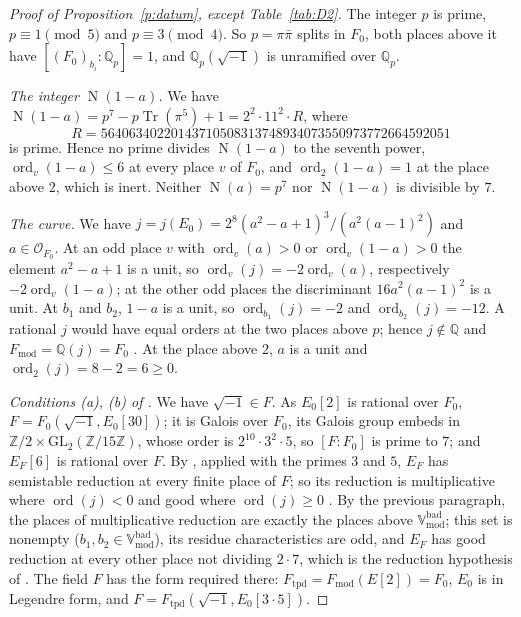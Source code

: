 \documentclass[11pt]{amsart}
\theoremstyle{remark}
\newcommand{\Q}{\mathbb Q}
\newcommand{\Z}{\mathbb Z}
\newcommand{\Qp}{\mathbb Q_p}
\newcommand{\cO}{\mathcal O}
\newcommand{\Fmod}{F_{\mathrm{mod}}}
\newcommand{\Vbadmod}{\mathbb V^{\mathrm{bad}}_{\mathrm{mod}}}
\newcommand{\Nm}{\operatorname{N}}
\newcommand{\Tr}{\operatorname{Tr}}
\begin{document}
\begin{proof}[Proof of Proposition~\ref{p:datum}, except Table~\ref{tab:D2}]
The integer $p$ is prime, $p\equiv1\pmod5$ and $p\equiv3\pmod4$. So $p=\pi\bar\pi$ splits in $F_0$, both places
above it have $[(F_0)_{b_i}:\Qp]=1$, and $\Qp(\sqrt{-1})$ is unramified over $\Qp$.

\emph{The integer $\Nm(1-a)$.} We have $\Nm(1-a)=p^7-p\Tr(\pi^5)+1=2^2\cdot11^2\cdot R$, where
\[
R=56406340220143710508313748934073550973772664592051
\]
is prime. Hence no prime divides $\Nm(1-a)$ to the seventh power, $\operatorname{ord}_v(1-a)\le6$ at every place $v$ of $F_0$,
and $\operatorname{ord}_2(1-a)=1$ at the place above $2$, which is inert. Neither $\Nm(a)=p^7$ nor $\Nm(1-a)$ is
divisible by $7$.

\emph{The curve.} We have $j=j(E_0)=2^8(a^2-a+1)^3/(a^2(a-1)^2)$ and $a\in\cO_{F_0}$. At an odd place $v$ with
$\operatorname{ord}_v(a)>0$ or $\operatorname{ord}_v(1-a)>0$ the element $a^2-a+1$ is a unit, so
$\operatorname{ord}_v(j)=-2\operatorname{ord}_v(a)$, respectively $-2\operatorname{ord}_v(1-a)$; at the other odd
places the discriminant $16a^2(a-1)^2$ is a unit. At $b_1$ and $b_2$, $1-a$ is a unit, so
$\operatorname{ord}_{b_1}(j)=-2$ and $\operatorname{ord}_{b_2}(j)=-12$. A rational $j$ would have equal orders at the
two places above $p$; hence $j\notin\Q$ and $\Fmod=\Q(j)=F_0$ \cite[Prop.~1.8(ii), p.~19]{IUT4}. At the place above
$2$, $a$ is a unit and $\operatorname{ord}_2(j)=8-2=6\ge0$.

\emph{Conditions (a), (b) of \cite[Def.~3.1]{IUT1}.} We have $\sqrt{-1}\in F$. As $E_0[2]$ is rational over $F_0$,
$F=F_0(\sqrt{-1},E_0[30])$; it is Galois over $F_0$, its Galois group embeds in $\Z/2\times\mathrm{GL}_2(\Z/15\Z)$,
whose order is $2^{10}\cdot3^2\cdot5$, so $[F:F_0]$ is prime to $7$; and $E_F[6]$ is rational over $F$. By \cite[Prop.~1.8(v), p.~19]{IUT4},
applied with the primes $3$ and $5$, $E_F$ has semistable reduction at every finite place of $F$; so its reduction
is multiplicative where $\operatorname{ord}(j)<0$ and good where $\operatorname{ord}(j)\ge0$
\cite[Props.~VII.5.1, VII.5.5]{Sil}. By the previous paragraph, the places of multiplicative reduction are exactly
the places above $\Vbadmod$; this set is nonempty ($b_1,b_2\in\Vbadmod$), its residue characteristics are odd, and
$E_F$ has good reduction at every other place not dividing $2\cdot7$, which is the reduction hypothesis of
\cite[Thm.~1.10]{IUT4}. The field $F$ has the form required there: $F_{\mathrm{tpd}}=\Fmod(E[2])=F_0$, $E_0$ is in
Legendre form, and $F=F_{\mathrm{tpd}}(\sqrt{-1},E_0[3\cdot5])$.


\end{proof}
\end{document}
